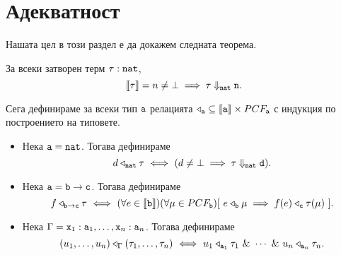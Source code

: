 \section{Адекватност}
Нашата цел в този раздел е да докажем следната теорема.
\begin{framed}
  \begin{theorem}
    За всеки затворен терм $\tau : \texttt{nat}$, 
    \[\llbracket{\tau}\rrbracket = n \neq \bot \implies \tau \Downarrow_{\texttt{nat}} \texttt{n}.\]
  \end{theorem}
\end{framed}


Сега дефинираме за всеки тип $\texttt{a}$ релацията 
$\triangleleft_{\texttt{a}} \subseteq \llbracket{\texttt{a}}\rrbracket \times PCF_{\texttt{a}}$
с индукция по построението на типовете.

\begin{itemize}
\item
  Нека $\texttt{a} = \texttt{nat}$. Тогава дефинираме
  \[d \triangleleft_{\texttt{nat}} \tau \ \Longleftrightarrow\  ( d\neq\bot \implies \tau \Downarrow_{\texttt{nat}} \texttt{d}).\]
\item
  Нека $\texttt{a} = \texttt{b} \to \texttt{c}$. Тогава дефинираме
  \[f \triangleleft_{\texttt{b}\to\texttt{c}} \tau \ \Longleftrightarrow\  (\forall e\in \llbracket{\texttt{b}}\rrbracket)(\forall \mu \in PCF_{\texttt{b}})[\ e \triangleleft_{\texttt{b}} \mu \implies f(e) \triangleleft_{\texttt{c}} \tau(\mu)\ ].\]
\item
  Нека $\Gamma = \texttt{x}_1:\texttt{a}_1, \dots, \texttt{x}_n:\texttt{a}_n$. Тогава дефинираме 
  \[(u_1,\dots,u_n) \triangleleft_\Gamma (\tau_1,\dots,\tau_n) \iff u_1 \triangleleft_{\vv{a}_1} \tau_1\ \&\ \cdots\ \&\ u_n \triangleleft_{\vv{a}_n} \tau_n.\]
\end{itemize}


